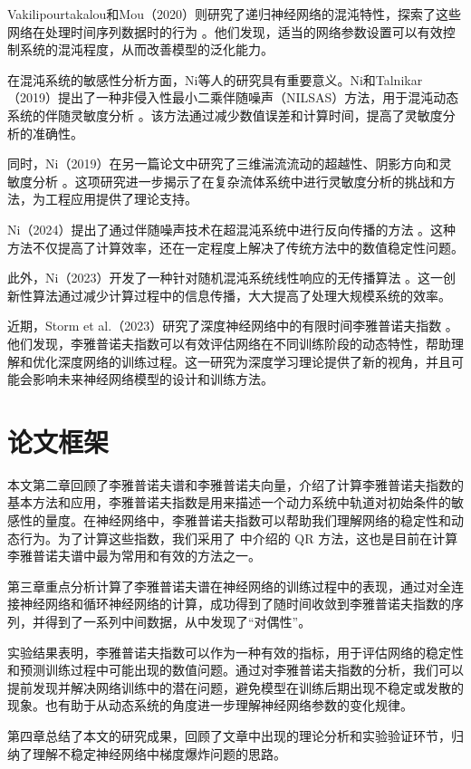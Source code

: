 Vakilipourtakalou和Mou（2020）则研究了递归神经网络的混沌特性，探索了这些网络在处理时间序列数据时的行为 \cite{vakilipourtakalou2020chaotic}。他们发现，适当的网络参数设置可以有效控制系统的混沌程度，从而改善模型的泛化能力。

在混沌系统的敏感性分析方面，Ni等人的研究具有重要意义。Ni和Talnikar（2019）提出了一种非侵入性最小二乘伴随噪声（NILSAS）方法，用于混沌动态系统的伴随灵敏度分析 \cite{Ni20192}。该方法通过减少数值误差和计算时间，提高了灵敏度分析的准确性。

同时，Ni（2019）在另一篇论文中研究了三维湍流流动的超越性、阴影方向和灵敏度分析 \cite{Ni20192}。这项研究进一步揭示了在复杂流体系统中进行灵敏度分析的挑战和方法，为工程应用提供了理论支持。

Ni（2024）提出了通过伴随噪声技术在超混沌系统中进行反向传播的方法 \cite{ni2024backpropagation}。这种方法不仅提高了计算效率，还在一定程度上解决了传统方法中的数值稳定性问题。

此外，Ni（2023）开发了一种针对随机混沌系统线性响应的无传播算法 \cite{ni2023nopropagate}。这一创新性算法通过减少计算过程中的信息传播，大大提高了处理大规模系统的效率。

近期，Storm et al.（2023）研究了深度神经网络中的有限时间李雅普诺夫指数 \cite{storm2023finitetime}。他们发现，李雅普诺夫指数可以有效评估网络在不同训练阶段的动态特性，帮助理解和优化深度网络的训练过程。这一研究为深度学习理论提供了新的视角，并且可能会影响未来神经网络模型的设计和训练方法。

\section{论文框架}

本文第二章回顾了李雅普诺夫谱和李雅普诺夫向量，介绍了计算李雅普诺夫指数的基本方法和应用，李雅普诺夫指数是用来描述一个动力系统中轨道对初始条件的敏感性的量度。在神经网络中，李雅普诺夫指数可以帮助我们理解网络的稳定性和动态行为。为了计算这些指数，我们采用了 \cite{Ni20191} 中介绍的 QR 方法，这也是目前在计算李雅普诺夫谱中最为常用和有效的方法之一。

第三章重点分析计算了李雅普诺夫谱在神经网络的训练过程中的表现，通过对全连接神经网络和循环神经网络的计算，成功得到了随时间收敛到李雅普诺夫指数的序列，并得到了一系列中间数据，从中发现了“对偶性”。

实验结果表明，李雅普诺夫指数可以作为一种有效的指标，用于评估网络的稳定性和预测训练过程中可能出现的数值问题。通过对李雅普诺夫指数的分析，我们可以提前发现并解决网络训练中的潜在问题，避免模型在训练后期出现不稳定或发散的现象。也有助于从动态系统的角度进一步理解神经网络参数的变化规律。

第四章总结了本文的研究成果，回顾了文章中出现的理论分析和实验验证环节，归纳了理解不稳定神经网络中梯度爆炸问题的思路。